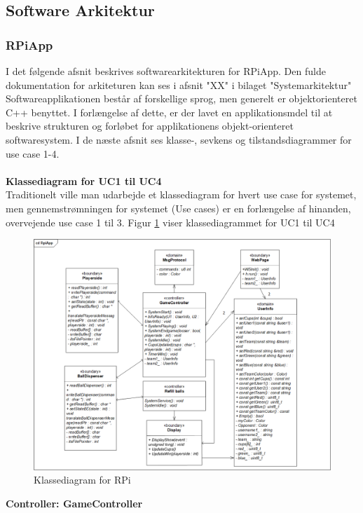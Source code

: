 \documentclass[Rapport/Rapport_main.tex]{subfiles}
\begin{document}
\subsection{Software Arkitektur}
\subsubsection{RPiApp}
I det følgende afsnit beskrives softwarearkitekturen for RPiApp. Den fulde dokumentation for arkiteturen kan ses i afsnit "XX" i bilaget "Systemarkitektur" \\
Softwareapplikationen består af forskellige sprog, men generelt er objektorienteret C++ benyttet. I forlængelse af dette, er der lavet en applikationsmdel til at beskrive strukturen og forløbet for applikationens objekt-orienteret softwaresystem. I de næste afsnit ses klasse-, sevkens og tilstandsdiagrammer for use case 1-4. \\\\
\textbf{Klassediagram for UC1 til UC4}\\
Traditionelt ville man udarbejde et klassediagram for hvert use case for systemet, men gennemstrømningen for systemet (Use cases) er en forlængelse af hinanden, overvejende use case 1 til 3. Figur \ref{fig:CD_RPI_RAP} viser klassediagrammet for UC1 til UC4
\begin{figure}[H]
    \centering
    \includegraphics[width=\textwidth]{Arkitektur/Softwarearkitektur/Applikationsmodel/RPi/graphics_RPi/Class.png}
    \caption{Klassediagram for RPi}
    \label{fig:CD_RPI_RAP}
\end{figure}
\textbf{Controller:  GameController}\\
\end{document}
